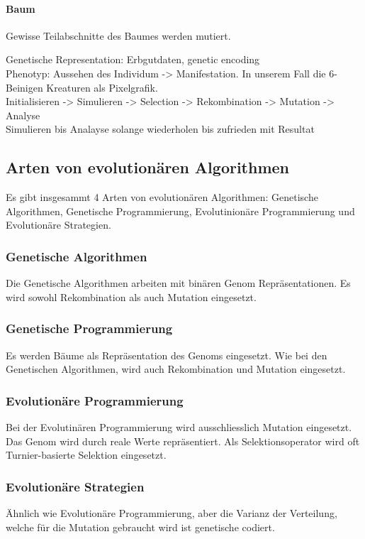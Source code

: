      \paragraph{Baum}
        Gewisse Teilabschnitte des Baumes werden mutiert.

    Genetische Representation: Erbgutdaten, genetic encoding \\
    Phenotyp: Aussehen des Individum -> Manifestation. In unserem Fall die 6-Beinigen Kreaturen als Pixelgrafik. \\
    Initialisieren -> Simulieren -> Selection -> Rekombination -> Mutation -> Analyse \\
    Simulieren bis Analayse solange wiederholen bis zufrieden mit Resultat

  \subsection{Arten von evolutionären Algorithmen}
  \label{sub:artenEvAlgos}
    Es gibt insgesammt 4 Arten von evolutionären Algorithmen:
    Genetische Algorithmen, Genetische Programmierung, Evolutinionäre Programmierung
    und Evolutionäre Strategien.

    \subsubsection{Genetische Algorithmen}
    \label{item:genAlgo}
      Die Genetische Algorithmen arbeiten mit binären Genom Repräsentationen.
      Es wird sowohl Rekombination als auch Mutation eingesetzt.

    \subsubsection{Genetische Programmierung}
    \label{item:genProg}
      Es werden Bäume als Repräsentation des Genoms eingesetzt. Wie bei den Genetischen Algorithmen,
      wird auch Rekombination und Mutation eingesetzt.

    \subsubsection{Evolutionäre Programmierung}
    \label{item:evProg}
      Bei der Evolutinären Programmierung wird ausschliesslich Mutation eingesetzt.
      Das Genom wird durch reale Werte repräsentiert. Als Selektionsoperator wird
      oft Turnier-basierte Selektion eingesetzt.

    \subsubsection{Evolutionäre Strategien}
    \label{item:evStrat}
        Ähnlich wie Evolutionäre Programmierung, aber die Varianz der Verteilung,
        welche für die Mutation gebraucht wird ist genetische codiert.
